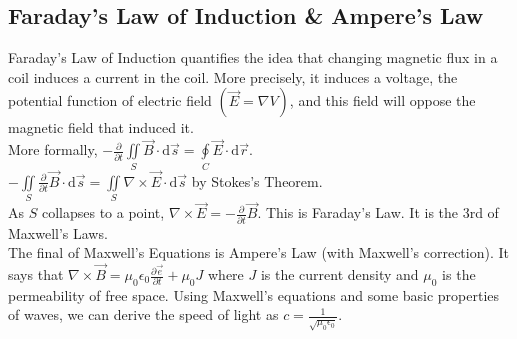 \subsection{Faraday's Law of Induction \& Ampere's Law}
\noindent
Faraday’s Law of Induction quantifies the idea that changing magnetic flux in a coil induces a current in the coil. More precisely, it induces a voltage, the potential function of electric field $\left(\vec{E} = \nabla V\right)$, and this field will oppose the magnetic field that induced it.\\
More formally, $-\frac{\partial}{\partial t}\iint\limits_{S}{\vec{B} \cdot \mathrm{d}\vec{s}} = \oint\limits_{C}{\vec{E} \cdot \mathrm{d}\vec{r}}$.\\
$-\iint\limits_{S}{\frac{\partial}{\partial t}\vec{B} \cdot \mathrm{d}\vec{s}} = \iint\limits_{S}{\nabla \times \vec{E} \cdot \mathrm{d}\vec{s}}$ by Stokes's Theorem.\\
As $S$ collapses to a point, $\nabla \times \vec{E} = -\frac{\partial}{\partial t}\vec{B}$. This is Faraday's Law. It is the 3rd of Maxwell's Laws.\\

\noindent
The final of Maxwell's Equations is Ampere's Law (with Maxwell's correction). It says that $\nabla \times \vec{B} = \mu_0\epsilon_0\frac{\partial\vec{e}}{\partial t} + \mu_0J$ where $J$ is the current density and $\mu_0$ is the permeability of free space. Using Maxwell's equations and some basic properties of waves, we can derive the speed of light as $c = \frac{1}{\sqrt{\mu_0\epsilon_0}}$.